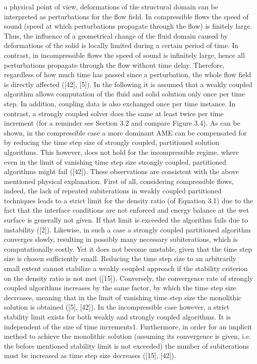a physical point of view, deformations of the structural domain can be interpreted as perturbations for
the flow field. In compressible flows the speed of sound (speed at which perturbations propagate through
the flow) is finitely large. Thus, the influence of a geometrical change of the fluid domain caused by
deformations of the solid is locally limited during a certain period of time. In contrast, in incompressible
flows the speed of sound is infinitely large, hence all perturbations propagate through the flow without
time delay. Therefore, regardless of how much time has passed since a perturbation, the whole flow field
is directly affected ([42], [5]).
In the following it is assumed that a weakly coupled algorithm allows computation of the fluid and solid
solution only once per time step. In addition, coupling data is also exchanged once per time instance. In
contrast, a strongly coupled solver does the same at least twice per time increment (for a reminder see
Section 3.2 and compare Figure 3.4). As can be shown, in the compressible case a more dominant AME
can be compensated for by reducing the time step size of strongly coupled, partitioned solution algorithms.
This however, does not hold for the incompressible regime, where even in the limit of vanishing time step
size strongly coupled, partitioned algorithms might fail ([42]). These observations are consistent with the
above mentioned physical explanation.
First of all, considering compressible flows, indeed, the lack of repeated subiterations in weakly coupled
partitioned techniques leads to a strict limit for the density ratio (of Equation 3.1) due to the fact that
the interface conditions are not enforced and energy balance at the wet surface is generally not given.
If that limit is exceeded the algorithm fails due to instability ([2]). Likewise, in such a case a strongly
coupled partitioned algorithm converges slowly, resulting in possibly many necessary subiterations, which
is computationally costly. Yet it does not become unstable, given that the time step size is chosen sufficiently
small. Reducing the time step size to an arbitrarily small extent cannot stabilize a weakly coupled
approach if the stability criterion on the density ratio is not met ([15]). Conversely, the convergence
rate of strongly coupled algorithms increases by the same factor, by which the time step size decreases,
meaning that in the limit of vanishing time step size the monolithic solution is obtained ([5], [42]).
In the incompressible case however, a strict stability limit exists for both weakly and strongly coupled
algorithms. It is independent of the size of time increments1. Furthermore, in order for an implicit
method to achieve the monolithic solution (assuming its convergence is given, i.e. the before mentioned
stability limit is not exceeded) the number of subiterations must be increased as time step size decreases
([15], [42]).
